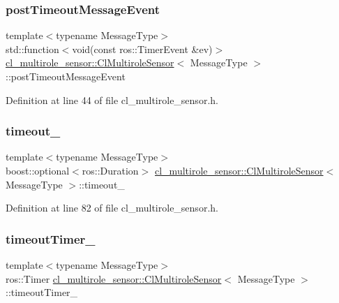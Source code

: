 \subsubsection{\texorpdfstring{post\+Timeout\+Message\+Event}{postTimeoutMessageEvent}}
{\footnotesize\ttfamily template$<$typename Message\+Type$>$ \\
std\+::function$<$void(const ros\+::\+Timer\+Event \&ev)$>$ \hyperlink{classcl__multirole__sensor_1_1ClMultiroleSensor}{cl\+\_\+multirole\+\_\+sensor\+::\+Cl\+Multirole\+Sensor}$<$ Message\+Type $>$\+::post\+Timeout\+Message\+Event}



Definition at line 44 of file cl\+\_\+multirole\+\_\+sensor.\+h.

\mbox{\label{classcl__multirole__sensor_1_1ClMultiroleSensor_a25cddc88db7d6208258630c0e5982f1e}} 
\subsubsection{\texorpdfstring{timeout\+\_\+}{timeout\_}}
{\footnotesize\ttfamily template$<$typename Message\+Type$>$ \\
boost\+::optional$<$ros\+::\+Duration$>$ \hyperlink{classcl__multirole__sensor_1_1ClMultiroleSensor}{cl\+\_\+multirole\+\_\+sensor\+::\+Cl\+Multirole\+Sensor}$<$ Message\+Type $>$\+::timeout\+\_\+}



Definition at line 82 of file cl\+\_\+multirole\+\_\+sensor.\+h.

\mbox{\label{classcl__multirole__sensor_1_1ClMultiroleSensor_abd24848b13def072d7e89b830937439f}} 
\subsubsection{\texorpdfstring{timeout\+Timer\+\_\+}{timeoutTimer\_}}
{\footnotesize\ttfamily template$<$typename Message\+Type$>$ \\
ros\+::\+Timer \hyperlink{classcl__multirole__sensor_1_1ClMultiroleSensor}{cl\+\_\+multirole\+\_\+sensor\+::\+Cl\+Multirole\+Sensor}$<$ Message\+Type $>$\+::timeout\+Timer\+\_\+\hspace{0.3cm}{\ttfamily [private]}}



